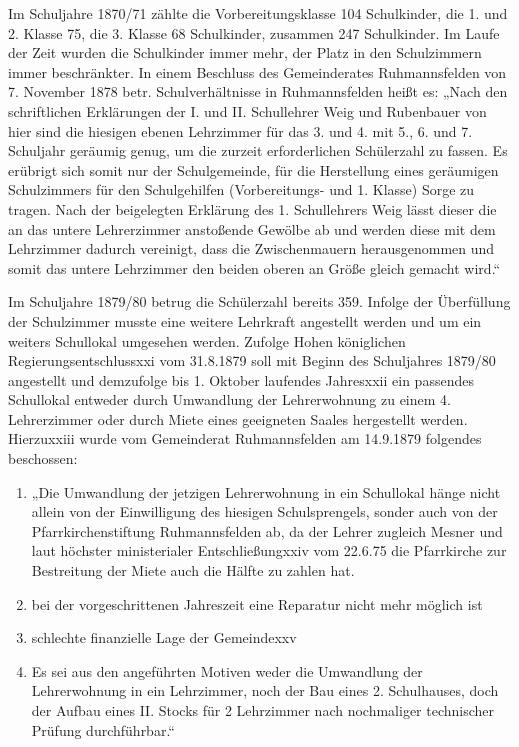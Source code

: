 \documentclass[12pt,a4paper]{book}
\begin{document}
Im Schuljahre 1870/71 zählte die Vorbereitungsklasse 104 Schulkinder, die 1. und
2. Klasse 75, die 3. Klasse 68 Schulkinder, zusammen 247 Schulkinder. Im Laufe
der Zeit wurden die Schulkinder immer mehr, der Platz in den Schulzimmern immer
beschränkter. In einem Beschluss des Gemeinderates Ruhmannsfelden von 7.
November 1878 betr. Schulverhältnisse in Ruhmannsfelden heißt es: „Nach den
schriftlichen Erklärungen der I. und II. Schullehrer Weig und Rubenbauer von
hier sind die hiesigen ebenen Lehrzimmer für das 3. und 4. mit 5., 6. und 7.
Schuljahr geräumig genug, um die zurzeit erforderlichen Schülerzahl zu fassen.
Es erübrigt sich somit nur der Schulgemeinde, für die Herstellung eines
geräumigen Schulzimmers für den Schulgehilfen (Vorbereitungs- und 1. Klasse)
Sorge zu tragen. Nach der beigelegten Erklärung des 1. Schullehrers Weig lässt
dieser die an das untere Lehrerzimmer anstoßende Gewölbe ab und werden diese mit
dem Lehrzimmer dadurch vereinigt, dass die Zwischenmauern herausgenommen und
somit das untere Lehrzimmer den beiden oberen an Größe gleich gemacht wird.“

Im Schuljahre 1879/80 betrug die Schülerzahl bereits 359. Infolge der
Überfüllung der Schulzimmer musste eine weitere Lehrkraft angestellt werden und
um ein weiters Schullokal umgesehen werden. Zufolge Hohen königlichen
Regierungsentschlussxxi vom 31.8.1879 soll mit Beginn des Schuljahres 1879/80
angestellt und demzufolge bis 1. Oktober laufendes Jahresxxii ein passendes
Schullokal entweder durch Umwandlung der Lehrerwohnung zu einem 4. Lehrerzimmer
oder durch Miete eines geeigneten Saales hergestellt werden. Hierzuxxiii wurde
vom Gemeinderat Ruhmannsfelden am 14.9.1879 folgendes beschossen:

\begin{enumerate}
\item „Die Umwandlung der jetzigen Lehrerwohnung in ein Schullokal hänge nicht
allein von der Einwilligung des hiesigen Schulsprengels, sonder auch von der
Pfarrkirchenstiftung Ruhmannsfelden ab, da der Lehrer zugleich Mesner und laut
höchster ministerialer Entschließungxxiv vom 22.6.75 die Pfarrkirche zur
Bestreitung der Miete auch die Hälfte zu zahlen hat.

\item bei der vorgeschrittenen Jahreszeit eine Reparatur nicht mehr möglich ist

\item schlechte finanzielle Lage der Gemeindexxv

\item Es sei aus den angeführten Motiven weder die Umwandlung der Lehrerwohnung
in ein Lehrzimmer, noch der Bau eines 2. Schulhauses, doch der Aufbau eines II.
Stocks für 2 Lehrzimmer nach nochmaliger technischer Prüfung durchführbar.“
\end{enumerate}
\end{document}
